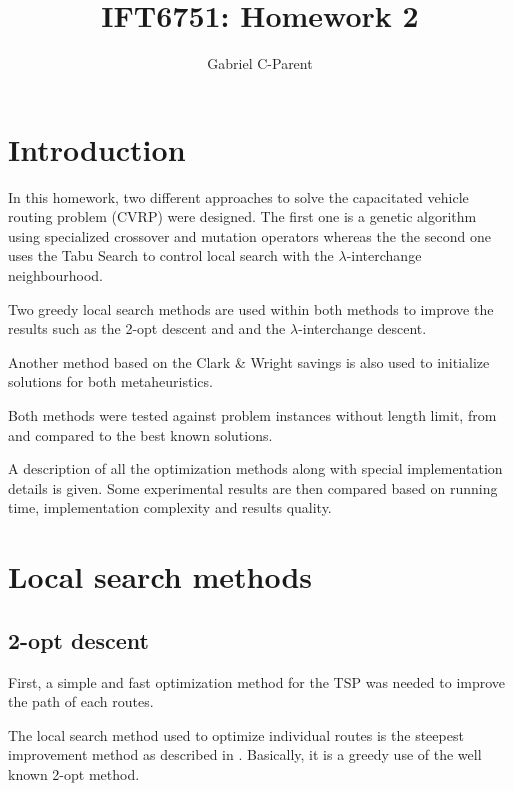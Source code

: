 \documentclass{article} %
\author{
Gabriel C-Parent\\
}
\begin{document}
\title{IFT6751: Homework 2}
      
\maketitle
\section{Introduction}

In this homework, two different approaches to solve the capacitated vehicle routing problem (CVRP) were designed. The first one is a genetic algorithm using specialized crossover and mutation operators whereas the the second one uses the Tabu Search to control local search with the $\lambda$-interchange neighbourhood.\newline

Two greedy local search methods are used within both methods to improve the results such as the 2-opt descent and  and the $\lambda$-interchange descent.\newline

Another method based on the Clark \& Wright savings is also used to initialize solutions for both metaheuristics.\newline


Both methods were tested against problem instances without length limit, from \citep{christofides} and compared to the best known solutions.\newline


A description of all the optimization methods along with special implementation details is given.
Some experimental results are then compared based on running time, implementation complexity and results quality.



\newpage
\section{Local search methods}
\label{local_search}


\subsection{2-opt descent}

First, a simple and fast optimization method for the TSP was needed to improve the path of each routes.

The local search method used to optimize individual routes is the steepest improvement method as described in \citep{steepest_improvement}.
Basically, it is a greedy use of the well known 2-opt method.\newline
\end{document}
